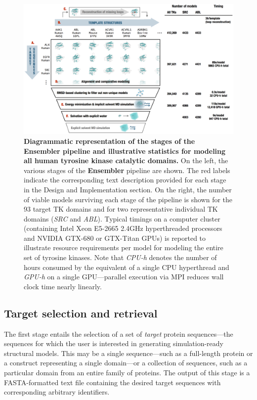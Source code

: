 \documentclass[aps,prl,preprint,nofootinbib,superscriptaddress,linenumbers]{revtex4-1}
\begin{document}
\begin{figure}[tb]
    \includegraphics[width=1.0\textwidth]{pipeline/pipeline2}

  \caption{\footnotesize {\bf Diagrammatic representation of the stages of the Ensembler pipeline and illustrative statistics for modeling all human tyrosine kinase catalytic domains.}
  On the left, the various stages of the {\bf Ensembler} pipeline are shown.
  The red labels indicate the corresponding text description provided for each stage in the Design and Implementation section.
  On the right, the number of viable models surviving each stage of the pipeline is shown for the 93 target TK domains and for two representative individual TK domains (\emph{SRC} and \emph{ABL}).
  Typical timings on a computer cluster (containing Intel Xeon E5-2665 2.4GHz hyperthreaded processors and NVIDIA GTX-680 or GTX-Titan GPUs) is reported to illustrate resource requirements per model for modeling the entire set of tyrosine kinases.
  Note that \emph{CPU-h} denotes the number of hours consumed by the equivalent of a single CPU hyperthread and \emph{GPU-h} on a single GPU---parallel execution via MPI reduces wall clock time nearly linearly.
  }
  \label{figure:pipeline}
\end{figure}

\subsection{Target selection and retrieval}

The first stage entails the selection of a set of \emph{target} protein sequences---the sequences for which the user is interested in generating simulation-ready structural models.
This may be a single sequence---such as a full-length protein or a construct representing a single domain---or a collection of sequences, such as a particular domain from an entire family of proteins.
The output of this stage is a FASTA-formatted text file containing the desired target sequences with corresponding arbitrary identifiers.
\end{document}
